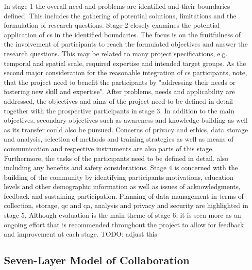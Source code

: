 
In stage 1 the overall need and problems are identified and their boundaries defined. This includes the gathering of potential solutions, limitations and the formulation of research questions. Stage 2 closely examines the potential application of \acrshort*{cs} in the identified boundaries. The focus is on the fruitfulness of the involvement of participants to reach the formulated objectives and answer the research questions. This may be related to many project specifications, e.g. temporal and spatial scale, required expertise and intended target groups. As the second major consideration for the reasonable integration of \acrshort*{cs} participants, \autocite[2]{fraislCitizenScienceEnvironmental2022} note, that the project need to benefit the participants by "addressing their needs or fostering new skill and expertise". After problems, needs and applicability are addressed, the objectives and aims of the project need to be defined in detail together with the prospective participants in stage 3. In addition to the main objectives, secondary objectives such as awareness and knowledge building as well as its transfer could also be pursued. Concerns of privacy and ethics, data storage and analysis, selection of methods and training strategies as well as means of communication and respective instruments are also parts of this stage. Furthermore, the tasks of the participants need to be defined in detail, also including any benefits and safety considerations. Stage 4 is concerned with the building of the community by identifying participants motivations, education levels and other demographic information as well as issues of acknowledgments, feedback and sustaining participation. Planning of data management in terms of collection, storage, \acrfull{qc} and \acrfull{qa}, analysis and privacy and security are highlighted in stage 5. Although evaluation is the main theme of stage 6, it is seen more as an ongoing effort that is recommended throughout the project to allow for feedback and improvement at each stage.\newline
TODO: adjust this 

\subsection{Seven-Layer Model of Collaboration}\label{subsec:slmc}

